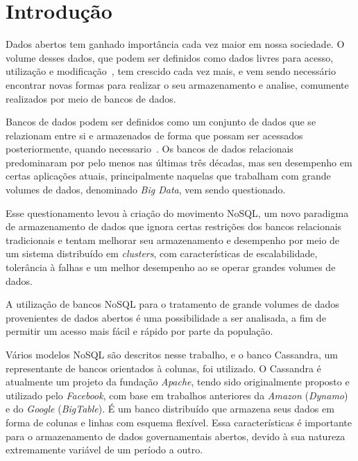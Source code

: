 \chapter{Introdução}

Dados abertos tem ganhado importância cada vez maior em nossa sociedade. O volume desses dados, que podem ser definidos como dados livres para acesso, utilização e modificação~\cite{opendefinition}, tem crescido cada vez mais, e vem sendo necessário encontrar novas formas para realizar o seu armazenamento e analise, comumente realizados por meio de bancos de dados.

Bancos de dados podem ser definidos como um conjunto de dados que se relazionam entre si e armazenados de forma que possam ser acessados posteriormente, quando necessario~\cite{leavitt2010nosql}.
Os bancos de dados relacionais predominaram por pelo menos nas últimas três décadas, mas seu desempenho em certas aplicações atuais, principalmente naquelas que trabalham com grande volumes de dados, denominado \emph{Big Data}, vem sendo questionado. 

Esse questionamento levou à criação do movimento NoSQL, um novo paradigma de armazenamento de dados que ignora certas restrições dos bancos relacionais tradicionais e tentam melhorar seu armazenamento e desempenho por meio de um sistema distribuído em \emph{clusters}, com características de escalabilidade, tolerância à falhas e um melhor desempenho ao se operar grandes volumes de dados.

A utilização de bancos NoSQL para o tratamento de grande volumes de dados provenientes de dados abertos é uma possibilidade a ser analisada, a fim de permitir um acesso mais fácil e rápido por parte da população. 

Vários modelos NoSQL são descritos nesse trabalho, e o banco Cassandra, um representante de bancos orientados à colunas, foi utilizado. O Cassandra é atualmente um projeto da fundação \emph{Apache}, tendo sido  originalmente proposto e utilizado pelo \emph{Facebook}, com base em trabalhos anteriores da \emph{Amazon} (\emph{Dynamo}) e do \emph{Google} (\emph{BigTable}). É um banco distribuído que armazena seus dados em forma de colunas e linhas com esquema flexível. Essa características é importante para o armazenamento de dados governamentais abertos, devido à sua natureza extremamente variável de um período a outro.








